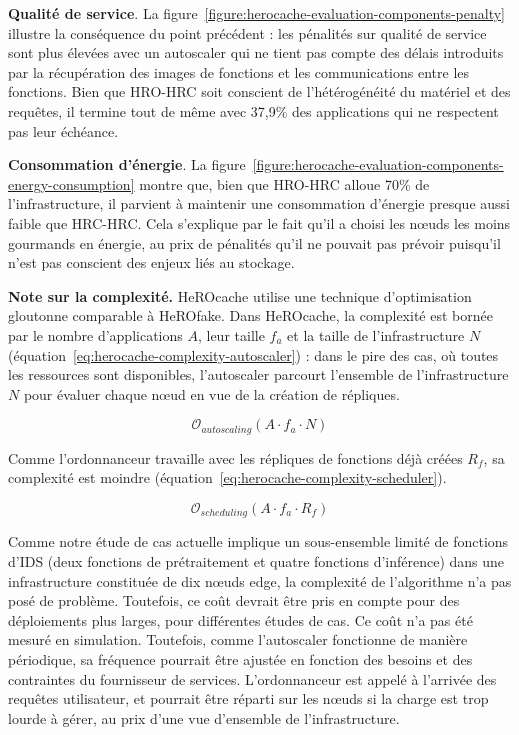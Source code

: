{\textbf{Qualité de service}. La figure~\ref{figure:herocache-evaluation-components-penalty} illustre la conséquence du point précédent : les pénalités sur qualité de service sont plus élevées avec un autoscaler qui ne tient pas compte des délais introduits par la récupération des images de fonctions et les communications entre les fonctions. Bien que HRO-HRC soit conscient de l'hétérogénéité du matériel et des requêtes, il termine tout de même avec 37,9\% des applications qui ne respectent pas leur échéance.

\textbf{Consommation d'énergie}. La figure~\ref{figure:herocache-evaluation-components-energy-consumption} montre que, bien que HRO-HRC alloue 70\% de l'infrastructure, il parvient à maintenir une consommation d'énergie presque aussi faible que HRC-HRC. Cela s'explique par le fait qu'il a choisi les nœuds les moins gourmands en énergie, au prix de pénalités qu'il ne pouvait pas prévoir puisqu'il n'est pas conscient des enjeux liés au stockage.

\textbf{Note sur la complexité.} HeROcache utilise une technique d'optimisation gloutonne comparable à HeROfake. Dans HeROcache, la complexité est bornée par le nombre d'applications $A$, leur taille $f_{a}$ et la taille de l'infrastructure $N$ (équation~\ref{eq:herocache-complexity-autoscaler}) : dans le pire des cas, où toutes les ressources sont disponibles, l'autoscaler parcourt l'ensemble de l'infrastructure $N$ pour évaluer chaque nœud en vue de la création de répliques.

\begin{equation}
    \mathcal{O}_{autoscaling}(A \cdot f_{a} \cdot N)
\label{eq:herocache-complexity-autoscaler}
\end{equation}

Comme l'ordonnanceur travaille avec les répliques de fonctions déjà créées $R_{f}$, sa complexité est moindre (équation~\ref{eq:herocache-complexity-scheduler}).

\begin{equation}
    \mathcal{O}_{scheduling}(A \cdot f_{a} \cdot R_{f})
\label{eq:herocache-complexity-scheduler}
\end{equation}

Comme notre étude de cas actuelle implique un sous-ensemble limité de fonctions d'IDS (deux fonctions de prétraitement et quatre fonctions d'inférence) dans une infrastructure constituée de dix nœuds edge, la complexité de l'algorithme n'a pas posé de problème. Toutefois, ce coût devrait être pris en compte pour des déploiements plus larges, pour différentes études de cas. Ce coût n'a pas été mesuré en simulation. Toutefois, comme l'autoscaler fonctionne de manière périodique, sa fréquence pourrait être ajustée en fonction des besoins et des contraintes du fournisseur de services. L'ordonnanceur est appelé à l'arrivée des requêtes utilisateur, et pourrait être réparti sur les nœuds si la charge est trop lourde à gérer, au prix d'une vue d'ensemble de l'infrastructure.

}
